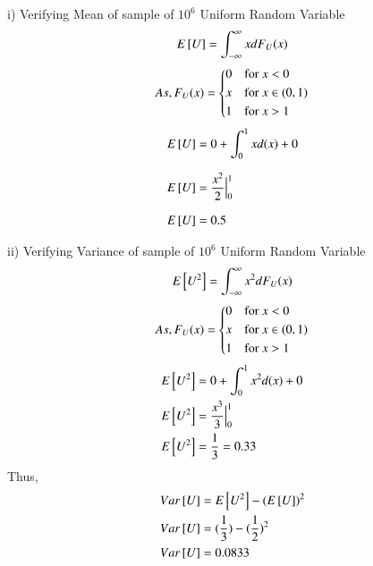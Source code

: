 \documentclass[journal,12pt,twocolumn]{IEEEtran}
\begin{document}
i) Verifying Mean of sample of $10^6$ Uniform Random Variable
\begin{align}
    E{}\left[U\right] &= \int_{-\infty}^{\infty}xdF_{U}(x)\\
\end{align}
\begin{equation}
    As,F_{U}(x) = 
    \begin{cases*}
        0 & for $x < 0$ \\
        x & for $x \in (0,1)$\\
        1 & for $x > 1$
    \end{cases*}
\end{equation}
\begin{align}
    E{}\left[U\right] &= 0 + \int_{0}^{1}xd(x) + 0\\[7pt]
    E{}\left[U\right] &= \dfrac{x^2}{2} \Big|_0^1\\[7pt]
    E{}\left[U\right] &= 0.5
\end{align}
%

ii) Verifying Variance of sample of $10^6$ Uniform Random Variable
\begin{align}
    E{}\left[U^2\right] = \int_{-\infty}^{\infty}x^2dF_{U}(x)
\end{align}
\begin{equation*}
    As,F_{U}(x) = 
    \begin{cases*}
        0 & for $x < 0$ \\
        x & for $x \in (0,1)$\\
        1 & for $x > 1$
    \end{cases*}
\end{equation*}
\begin{align}
        E{}\left[U^2\right] &= 0+\int_{0}^{1}x^2d(x)+0\\
        E{}\left[U^2\right] &= \dfrac{x^3}{3} \Big|_0^1\\
        E{}\left[U^2\right] &= \dfrac{1}{3} = 0.33 \\
\end{align}
Thus,
\begin{align}
    Var{}\left[U\right] &= E{}\left[U^2\right] - (E{}\left[U\right])^2\\
    Var{}\left[U\right] &= (\dfrac{1}{3}) - (\dfrac{1}{2})^2\\
    Var{}\left[U\right] &= 0.0833
\end{align}
%    
    
\end{document}
